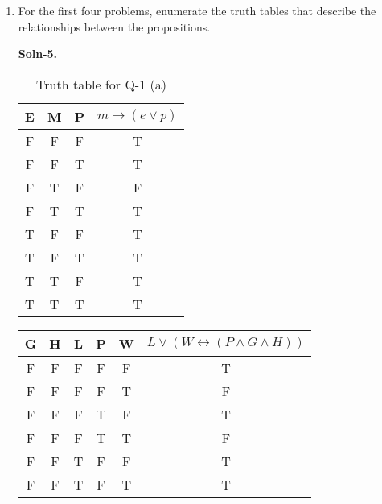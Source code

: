 \documentclass{article}
\begin{document}
\begin{enumerate}
\item   For the first four problems, enumerate the truth tables that
        describe the relationships between the propositions.

        \textbf{Soln-5.}  
        \begin{table} [H]
                \centering
                \begin{tabular}{ | c | c | c | c | }
                \hline
                \textbf{E} & \textbf{M} & \textbf{P} & \textbf{$m \rightarrow (e \vee p)$} \\ [0.5 ex]
                \hline 
                F & F & F & T \\
                \hline
                F & F & T & T \\
                \hline
                F & T & F & F \\
                \hline
                F & T & T & T \\ 
                \hline
                T & F & F & T \\
                \hline
                T & F & T & T \\
                \hline
                T & T & F & T \\
                \hline
                T & T & T & T \\ [1ex]
                \hline
                \end{tabular}
                \caption{Truth table for Q-1 (a)}
                \label {table:1}
        \end{table}
        \begin{table} [H]
                \centering
                \begin{tabular}{ | c | c | c | c | c | c | }
                \hline
                \textbf{G} & \textbf{H} & \textbf{L} & \textbf{P} & \textbf{W} & \textbf{$L \vee (W \leftrightarrow (P \wedge G \wedge H))$} \\ [0.5 ex]
                \hline 
                F & F & F & F & F & T \\
                \hline
                F & F & F & F & T & F \\
                \hline
                F & F & F & T & F & T \\
                \hline
                F & F & F & T & T & F \\
                \hline
                F & F & T & F & F & T \\
                \hline
                F & F & T & F & T & T \\

\end{tabular}
\end{table}
\end{enumerate}
\end{document}
